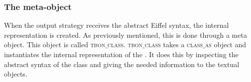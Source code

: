 \subsubsection{The meta-object}
\label{tbon_class}
When the output strategy receives the abstract Eiffel syntax, the internal \bon{} representation is created. As previously mentioned, this is done through a meta object. This object is called \textsc{tbon$\_$class}. \textsc{tbon$\_$class} takes a \textsc{class$\_$as} object and instantiates the internal representation of the \bon{}. It does this by inspecting the abstract syntax of the class and giving the needed information to the textual \bon{} objects.